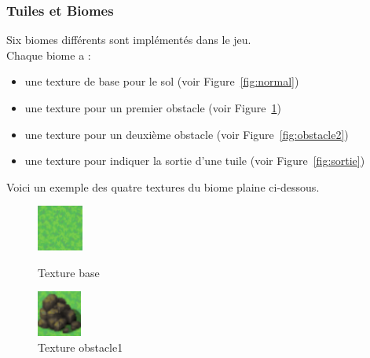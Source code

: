 \documentclass[11pt]{article}
\begin{document}
            \subsubsection{Tuiles et Biomes}
            Six biomes différents sont implémentés dans le jeu.\\
            Chaque biome a :
            \begin{itemize}
                \item une texture de base pour le sol (voir Figure~\ref{fig:normal})
                \item une texture pour un premier obstacle (voir Figure~\ref{fig:obstacle1})
                \item une texture pour un deuxième obstacle (voir Figure~\ref{fig:obstacle2})
                \item une texture pour indiquer la sortie d'une tuile (voir Figure~\ref{fig:sortie})
            \end{itemize}
            Voici un exemple des quatre textures du biome plaine ci-dessous. 
            \begin{figure}[H]
                \centering
                \begin{minipage}{0.45\textwidth}
                    \centering
                    \includegraphics[height=1.5cm]{normal.png}
                    \caption{Texture base}
                    \label{fig:normal}
                \end{minipage}
                \hfill
                \begin{minipage}{0.45\textwidth}
                    \centering
                    \includegraphics[height=1.5cm]{obstacle1.png}
                    \caption{Texture obstacle1}
                    \label{fig:obstacle1}
                \end{minipage}
            \end{figure}
\end{document}
